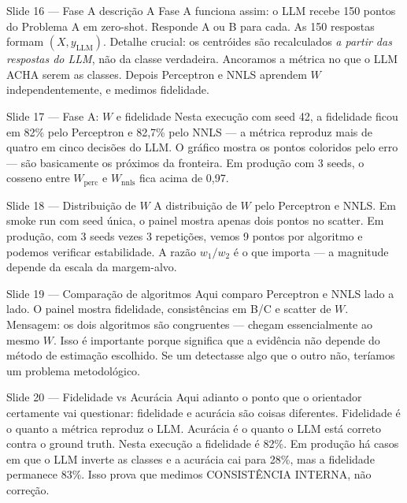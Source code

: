 \documentclass[aspectratio=169,10pt]{beamer}
\begin{document}
\begin{frame}{Slide 16 --- Fase A descri\c{c}\~ao}
\footnotesize
A Fase A funciona assim: o LLM recebe 150 pontos do Problema A em zero-shot. Responde A ou B para cada. As 150 respostas formam $(X, y_{\text{LLM}})$. Detalhe crucial: os centr\'oides s\~ao recalculados \emph{a partir das respostas do LLM}, n\~ao da classe verdadeira. Ancoramos a m\'etrica no que o LLM ACHA serem as classes. Depois Perceptron e NNLS aprendem $W$ independentemente, e medimos fidelidade.
\end{frame}

\begin{frame}{Slide 17 --- Fase A: $W$ e fidelidade}
\footnotesize
Nesta execu\c{c}\~ao com seed 42, a fidelidade ficou em 82\% pelo Perceptron e 82{,}7\% pelo NNLS --- a m\'etrica reproduz mais de quatro em cinco decis\~oes do LLM. O gr\'afico mostra os pontos coloridos pelo erro --- s\~ao basicamente os pr\'oximos da fronteira. Em produ\c{c}\~ao com 3 seeds, o cosseno entre $W_{\text{perc}}$ e $W_{\text{nnls}}$ fica acima de 0{,}97.
\end{frame}

\begin{frame}{Slide 18 --- Distribui\c{c}\~ao de $W$}
\footnotesize
A distribui\c{c}\~ao de $W$ pelo Perceptron e NNLS. Em smoke run com seed \'unica, o painel mostra apenas dois pontos no scatter. Em produ\c{c}\~ao, com 3 seeds vezes 3 repeti\c{c}\~oes, vemos 9 pontos por algoritmo e podemos verificar estabilidade. A raz\~ao $w_1/w_2$ \'e o que importa --- a magnitude depende da escala da margem-alvo.
\end{frame}

\begin{frame}{Slide 19 --- Compara\c{c}\~ao de algoritmos}
\footnotesize
Aqui comparo Perceptron e NNLS lado a lado. O painel mostra fidelidade, consist\^encias em B/C e scatter de $W$. Mensagem: os dois algoritmos s\~ao congruentes --- chegam essencialmente ao mesmo $W$. Isso \'e importante porque significa que a evid\^encia n\~ao depende do m\'etodo de estima\c{c}\~ao escolhido. Se um detectasse algo que o outro n\~ao, ter\'iamos um problema metodol\'ogico.
\end{frame}

\begin{frame}{Slide 20 --- Fidelidade vs Acur\'acia}
\footnotesize
Aqui adianto o ponto que o orientador certamente vai questionar: fidelidade e acur\'acia s\~ao coisas diferentes. Fidelidade \'e o quanto a m\'etrica reproduz o LLM. Acur\'acia \'e o quanto o LLM est\'a correto contra o ground truth. Nesta execu\c{c}\~ao a fidelidade \'e 82\%. Em produ\c{c}\~ao h\'a casos em que o LLM inverte as classes e a acur\'acia cai para 28\%, mas a fidelidade permanece 83\%. Isso prova que medimos CONSIST\^ENCIA INTERNA, n\~ao corre\c{c}\~ao.
\end{frame}
\end{document}
